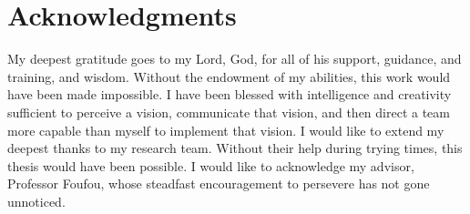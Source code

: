 \chapter*{Acknowledgments}

My deepest gratitude goes to my Lord, God, for all of his support, guidance, and training, and wisdom.  Without the endowment of my abilities, this work would have been made impossible.  I have been blessed with intelligence and creativity sufficient to perceive a vision, communicate that vision, and then direct a team more capable than myself to implement that vision.  I would like to extend my deepest thanks to my research team.  Without their help during trying times, this thesis would have been possible. I would like to acknowledge my advisor, Professor Foufou, whose steadfast encouragement to persevere has not gone unnoticed. 
